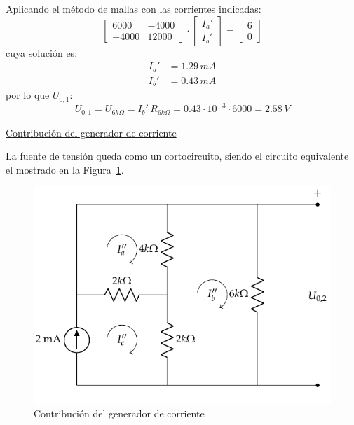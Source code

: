 \documentclass[11pt]{book} %
\begin{document}
\begin{example}
    Aplicando el método de mallas con las corrientes indicadas:
    \begin{equation*}
        \begin{bmatrix}
            6000 & -4000\\
            -4000 & 12000
        \end{bmatrix}
        \cdot
        \begin{bmatrix}
            I_a'\\
            I_b'
        \end{bmatrix}
        =
        \begin{bmatrix}
            6\\
            0
        \end{bmatrix}
    \end{equation*}
    cuya solución es:
    \begin{align*}
        I_a'&=1.29\,mA\\
        I_b'&=0.43\,mA
    \end{align*}
    por lo que $U_{0,1}$:
    \begin{equation*}
        U_{0,1}=U_{6k\Omega}=I_b'\, R_{6k\Omega}=0.43\cdot 10^{-3}\cdot 6000= 2.58\,V
    \end{equation*}
    
    \underline{Contribución del generador de corriente}
    
    La fuente de tensión queda como un cortocircuito, siendo el circuito equivalente el mostrado en la Figura~\ref{fig.ej_superposicion_cc_corriente}. 
    \begin{figure}[H]
        \centering
        \includegraphics{../figs/ej_superposicion_cc_corriente.pdf}
        \caption{Contribución del generador de corriente}
        \label{fig.ej_superposicion_cc_corriente}
    \end{figure}
    

\end{example}
\end{document}
